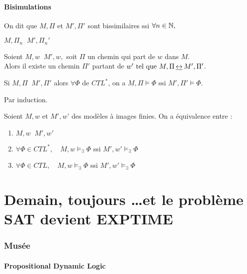 \documentclass[10pt,a4paper]{article}
\DeclareMathOperator{\bisim}{\underline{\leftrightarrow}}
\begin{document}
\subsection{Bisimulations}

\begin{definition}
 On dit que $M, \Pi$ et $M', \Pi'$ sont bissimilaires  ssi $\forall n \in \mathbb{N}, $

$M, \Pi_n \bisim M', \Pi_n'$
\end{definition}

\begin{prop}
 Soient $M, w \bisim M',w,$ soit $\Pi$ un chemin qui part de $w$ dans $M$.\\
 Alors il existe un chemin $\Pi'$ partant de $w' \tq M, \Pi \bisim M', \Pi'$.
\end{prop}
\begin{dem}
 
\end{dem}
\begin{prop}
 Si $M,\Pi \bisim M', \Pi'$ alors $\forall \Phi$ de $CTL^*$, on a 
$M, \Pi \models \Phi$ ssi $M', \Pi' \models \Phi$.
\end{prop}
\begin{dem}
 Par induction.
\end{dem}
\begin{thm}
 Soient $M,w$ et $M', w$' des modèles à images finies.
On a équivalence entre :
  \begin{enumerate}
   \item $M, w \bisim M', w'$
   \item $\forall \Phi \in CTL^*, \quad M,w \models_\exists \Phi$ ssi $M', w' \models_\exists \Phi$
   \item $\forall \Phi \in CTL,  \quad M,w \models_\exists \Phi$ ssi $M', w' \models_\exists \Phi$
  \end{enumerate}

\end{thm}


\part{Demain, toujours \dots et le problème SAT devient EXPTIME}

\section{Musée}

\subsection{Propositional Dynamic Logic}
\end{document}
